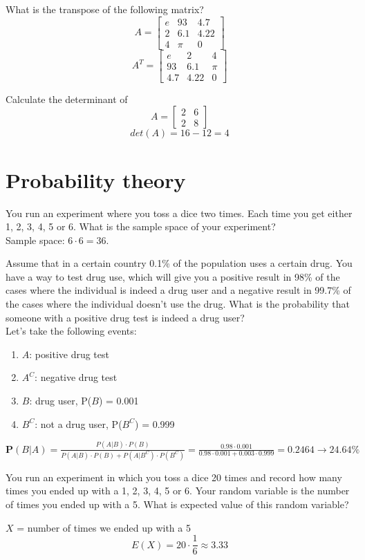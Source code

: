 \documentclass[10pt]{article}
\newenvironment{problem}[2][Problem]{\begin{trivlist}
\item[\hskip \labelsep {\bfseries #1}\hskip \labelsep {\bfseries #2.}]}{\end{trivlist}}
\begin{document}
\begin{problem}{4.3}
What is the transpose of the following matrix?
$$A=\begin{bmatrix}e & 93 & 4.7\\ 2 & 6.1 & 4.22 \\ 4 & \pi & 0\end{bmatrix}$$
$$A^T = \begin{bmatrix}e & 2 & 4\\ 93 & 6.1 & \pi \\ 4.7 & 4.22 & 0\end{bmatrix} $$
\end{problem}

\begin{problem}{4.4}
Calculate the determinant of
$$A=\begin{bmatrix}2 & 6 \\ 2 & 8 \end{bmatrix} $$
$$det(A) = 16-12 = 4$$
\end{problem}

\section{Probability theory}

\begin{problem}{5.1}
You run an experiment where you toss a dice two times. Each time you get either 1, 2, 3, 4, 5 or 6. What is the sample space of your experiment?
\medskip \\
Sample space: $6\cdot 6 = 36$.
\end{problem}

\begin{problem}{5.2}
Assume that in a certain country 0.1\% of the population uses a certain drug. You have a way to test drug use, which will give you a positive result in 98\% of the cases where the individual is indeed a drug user and a negative result in 99.7\% of the cases where the individual doesn't use the drug. What is the probability that someone with a positive drug test is indeed a drug user?
\medskip \\
Let's take the following events:
\begin{enumerate}[$\bullet$]
\item $A$: positive drug test
\item $A^C$: negative drug test
\item $B$: drug user, P($B$) = 0.001
\item $B^C$: not a drug user, P($B^C$) = 0.999
\end{enumerate}
$\textbf{P}(B|A) = \frac{P(A|B)\cdot P(B)}{P(A|B)\cdot P(B)+P(A|B^C)\cdot P(B^C)} = \frac{0.98\cdot 0.001}{0.98\cdot 0.001 + 0.003\cdot 0.999} = 0.2464 \rightarrow 24.64\%$
\end{problem}

\begin{problem}{5.3}
You run an experiment in which you toss a dice 20 times and record how many times you ended up with a 1, 2, 3, 4, 5 or 6. Your random variable is the number of times you ended up with a 5. What is  expected value of this random variable?
\end{problem}
$X$ = number of times we ended up with a 5 
$$E(X) = 20\cdot \frac{1}{6} \approx 3.33$$
\end{document}
